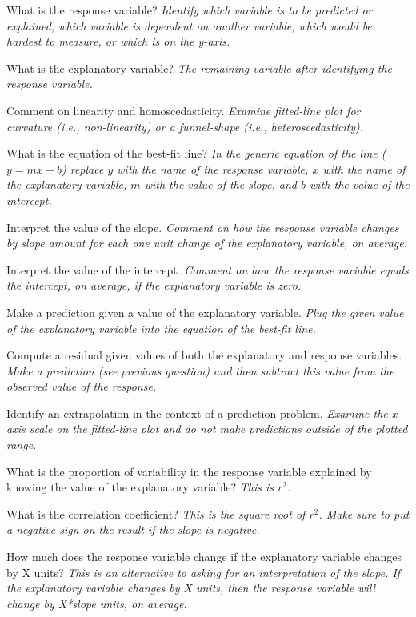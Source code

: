 \documentclass[10pt,openany]{book}\usepackage[]{graphicx}\usepackage[]{color}
\begin{document}
\begin{Enumerate}
  \item What is the response variable?  \textit{Identify which variable is to be predicted or explained, which variable is dependent on another variable, which would be hardest to measure, or which is on the y-axis.}
  \item What is the explanatory variable?  \textit{The remaining variable after identifying the response variable.}
  \item Comment on linearity and homoscedasticity.  \textit{Examine fitted-line plot for curvature (i.e., non-linearity) or a funnel-shape (i.e., heteroscedasticity).}
  \item What is the equation of the best-fit line?  \textit{In the generic equation of the line ($y=mx+b$) replace $y$ with the name of the response variable, $x$ with the name of the explanatory variable, $m$ with the value of the slope, and $b$ with the value of the intercept.}
  \item Interpret the value of the slope.  \textit{Comment on how the response variable changes by slope amount for each one unit change of the explanatory variable, on average.}
  \item Interpret the value of the intercept.  \textit{Comment on how the response variable equals the intercept, on average, if the explanatory variable is zero.}
  \item Make a prediction given a value of the explanatory variable.  \textit{Plug the given value of the explanatory variable into the equation of the best-fit line.}
  \item Compute a residual given values of both the explanatory and response variables.  \textit{Make a prediction (see previous question) and then subtract this value from the observed value of the response.}
  \item Identify an extrapolation in the context of a prediction problem.  \textit{Examine the x-axis scale on the fitted-line plot and do not make predictions outside of the plotted range.}
  \item What is the proportion of variability in the response variable explained by knowing the value of the explanatory variable?  \textit{This is $r^{2}$.}
  \item What is the correlation coefficient?  \textit{This is the square root of $r^{2}$.  Make sure to put a negative sign on the result if the slope is negative.}
  \item How much does the response variable change if the explanatory variable changes by X units?  \textit{This is an alternative to asking for an interpretation of the slope.  If the explanatory variable changes by X units, then the response variable will change by X*slope units, on average.}
\end{Enumerate}
\end{document}
